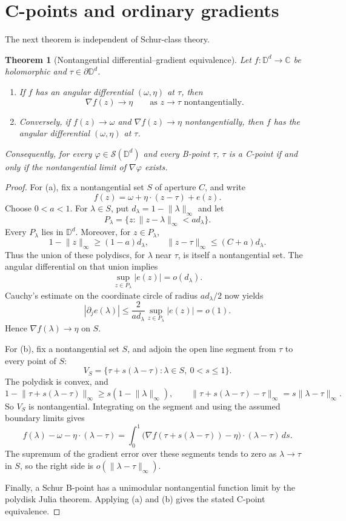 \documentclass[11pt]{article}
\newtheorem{theorem}{Theorem}
\theoremstyle{definition}
\theoremstyle{remark}
\newcommand{\D}{\mathbb D}
\newcommand{\C}{\mathbb C}
\newcommand{\norm}[1]{\lVert #1\rVert_\infty}
\newcommand{\Schur}{\mathcal S}
\begin{document}
\section{C-points and ordinary gradients}

The next theorem is independent of Schur-class theory.

\begin{theorem}[Nontangential differential--gradient equivalence]
\label{thm:cpoint}
Let \(f:\D^d\to\C\) be holomorphic and \(\tau\in\partial\D^d\).
\begin{enumerate}[label=(\alph*)]
\item If \(f\) has an angular differential \((\omega,\eta)\) at \(\tau\), then
\[
 \nabla f(z)\longrightarrow\eta
 \qquad\text{as }z\to\tau\text{ nontangentially}.
\]
\item Conversely, if \(f(z)\to\omega\) and \(\nabla f(z)\to\eta\) nontangentially, then \(f\) has the angular differential \((\omega,\eta)\) at \(\tau\).
\end{enumerate}
Consequently, for every \(\varphi\in\Schur(\D^d)\) and every B-point \(\tau\), \(\tau\) is a C-point if and only if the nontangential limit of \(\nabla\varphi\) exists.
\end{theorem}

\begin{proof}
For (a), fix a nontangential set \(S\) of aperture \(C\), and write
\[
 f(z)=\omega+\eta\mathbin{\cdot}(z-\tau)+e(z).
\]
Choose \(0<a<1\).  For \(\lambda\in S\), put \(d_\lambda=1-\norm\lambda\) and let
\[
 P_\lambda=\{z:\norm{z-\lambda}<a d_\lambda\}.
\]
Every \(P_\lambda\) lies in \(\D^d\).  Moreover, for \(z\in P_\lambda\),
\[
 1-\norm z\ge(1-a)d_\lambda,
 \qquad
 \norm{z-\tau}\le(C+a)d_\lambda.
\]
Thus the union of these polydiscs, for \(\lambda\) near \(\tau\), is itself a nontangential set.  The angular differential on that union implies
\[
 \sup_{z\in P_\lambda}|e(z)|=o(d_\lambda).
\]
Cauchy's estimate on the coordinate circle of radius \(ad_\lambda/2\) now yields
\[
 |\partial_j e(\lambda)|
 \le\frac{2}{ad_\lambda}\sup_{z\in P_\lambda}|e(z)|=o(1).
\]
Hence \(\nabla f(\lambda)\to\eta\) on \(S\).

For (b), fix a nontangential set \(S\), and adjoin the open line segment from \(\tau\) to every point of \(S\):
\[
 V_S=\{\tau+s(\lambda-\tau):\lambda\in S,\ 0<s\le1\}.
\]
The polydisk is convex, and
\[
 1-\norm{\tau+s(\lambda-\tau)}
 \ge s(1-\norm\lambda),
 \qquad
 \norm{\tau+s(\lambda-\tau)-\tau}=s\norm{\lambda-\tau}.
\]
So \(V_S\) is nontangential.  Integrating on the segment and using the assumed boundary limits gives
\[
 f(\lambda)-\omega-\eta\mathbin{\cdot}(\lambda-\tau)
 =\int_0^1
 \bigl(\nabla f(\tau+s(\lambda-\tau))-\eta\bigr)
 \mathbin{\cdot}(\lambda-\tau)\,ds.
\]
The supremum of the gradient error over these segments tends to zero as \(\lambda\to\tau\) in \(S\), so the right side is \(o(\norm{\lambda-\tau})\).

Finally, a Schur B-point has a unimodular nontangential function limit by the polydisk Julia theorem.  Applying (a) and (b) gives the stated C-point equivalence.
\end{proof}
\end{document}
